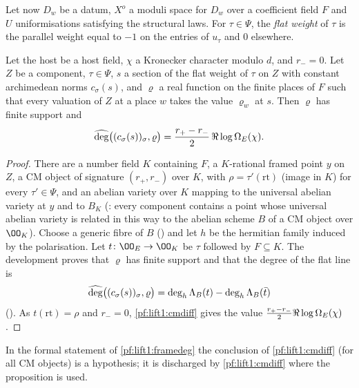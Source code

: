 Let now $D_w$ be a datum, $X^o$ a moduli space for $D_w$ over a coefficient field $F$ and $U$
uniformisations satisfying the structural laws. For $\tau\in\Psi$, the \emph{flat weight} of $\tau$ is the
parallel weight equal to $-1$ on the entries of $u_\tau$ and $0$ elsewhere.

\begin{proposition}\label{pf:lift1:framedeg}
Let the host be a host field, $\chi$ a Kronecker character modulo $d$, and $r_-=0$. Let $Z$ be a
component, $\tau\in\Psi$, $s$ a section of the flat weight of $\tau$ on $Z$ with constant archimedean
norms $c_\sigma(s)$, and $\varrho$ a real function on the finite places of $F$ such that every valuation
of $Z$ at a place $w$ takes the value $\varrho_w$ at $s$. Then $\varrho$ has finite support and
\[
\widehat{\deg}\bigl((c_\sigma(s))_\sigma,\varrho\bigr)=\frac{r_+-r_-}2\,\Re\log\Omega_E(\chi).
\]
\end{proposition}

\begin{proof}
There are a number field $K$ containing $F$, a $K$-rational framed point $y$ on $Z$, a CM object of
signature $(r_+,r_-)$ over $K$, with $\rho=\tau'(\mathrm{rt})$ (image in $K$) for every $\tau'\in\Psi$, and
an abelian variety over $K$ mapping to the universal abelian variety at $y$ and to $B_K$
(: every component contains a
point whose universal abelian variety is related in this way to the abelian scheme $B$ of a CM object
over $\OO_K$). Choose a generic fibre of $B$
() and let $h$ be the hermitian family induced by
the polarisation. Let $t\colon\OO_E\to\OO_K$ be $\tau$ followed by $F\subseteq K$. The development proves that
$\varrho$ has finite support and that the degree of the flat line is
\[
\widehat{\deg}\bigl((c_\sigma(s))_\sigma,\varrho\bigr)=\deg_h\Lambda_B(t)-\deg_h\Lambda_B(\bar t)
\]
(). As $t(\mathrm{rt})=\rho$ and
$r_-=0$, \cref{pf:lift1:cmdiff} gives the value $\frac{r_+-r_-}2\Re\log\Omega_E(\chi)$.
\end{proof}

\begin{remark}
In the formal statement of \cref{pf:lift1:framedeg} the conclusion of \cref{pf:lift1:cmdiff} (for all
CM objects) is a hypothesis; it is discharged by \cref{pf:lift1:cmdiff} where the proposition is used.
\end{remark}

